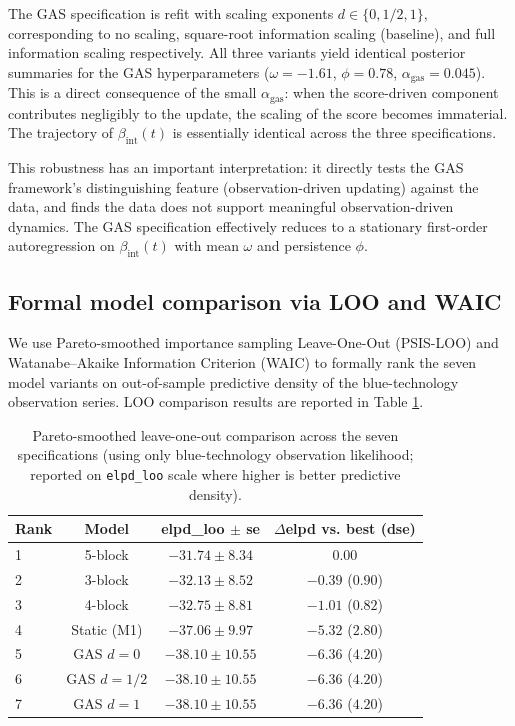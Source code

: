 \documentclass[11pt,a4paper]{article}
\newcommand{\bint}{\beta_{\mathrm{int}}}
\begin{document}
The GAS specification is refit with scaling exponents $d \in \{0, 1/2, 1\}$, corresponding to no scaling, square-root information scaling (baseline), and full information scaling respectively. All three variants yield identical posterior summaries for the GAS hyperparameters ($\omega = -1.61$, $\phi = 0.78$, $\alpha_{\mathrm{gas}} = 0.045$). This is a direct consequence of the small $\alpha_{\mathrm{gas}}$: when the score-driven component contributes negligibly to the update, the scaling of the score becomes immaterial. The trajectory of $\bint(t)$ is essentially identical across the three specifications.

This robustness has an important interpretation: it directly tests the GAS framework's distinguishing feature (observation-driven updating) against the data, and finds the data does not support meaningful observation-driven dynamics. The GAS specification effectively reduces to a stationary first-order autoregression on $\bint(t)$ with mean $\omega$ and persistence $\phi$.

\subsection{Formal model comparison via LOO and WAIC}
\label{sec:ch7-icomp}

We use Pareto-smoothed importance sampling Leave-One-Out (PSIS-LOO) and Watanabe--Akaike Information Criterion (WAIC) to formally rank the seven model variants on out-of-sample predictive density of the blue-technology observation series. LOO comparison results are reported in Table \ref{tab:ch7-loo}.

\begin{table}[h!]
\centering
\caption{Pareto-smoothed leave-one-out comparison across the seven specifications (using only blue-technology observation likelihood; reported on \texttt{elpd\_loo} scale where higher is better predictive density).}
\begin{tabular}{lccc}
\toprule
Rank & Model & elpd\_loo $\pm$ se & $\Delta$elpd vs. best (dse) \\
\midrule
1 & 5-block & $-31.74 \pm 8.34$ & $0.00$ \\
2 & 3-block & $-32.13 \pm 8.52$ & $-0.39$ ($0.90$) \\
3 & 4-block & $-32.75 \pm 8.81$ & $-1.01$ ($0.82$) \\
4 & Static (M1) & $-37.06 \pm 9.97$ & $-5.32$ ($2.80$) \\
5 & GAS $d = 0$ & $-38.10 \pm 10.55$ & $-6.36$ ($4.20$) \\
6 & GAS $d = 1/2$ & $-38.10 \pm 10.55$ & $-6.36$ ($4.20$) \\
7 & GAS $d = 1$ & $-38.10 \pm 10.55$ & $-6.36$ ($4.20$) \\
\bottomrule
\end{tabular}
\label{tab:ch7-loo}
\end{table}
\end{document}

